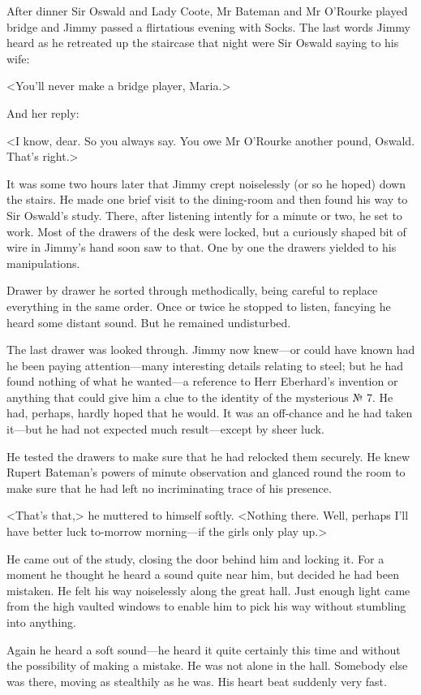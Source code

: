 After dinner Sir Oswald and Lady Coote, Mr Bateman and Mr O'Rourke played bridge and Jimmy passed a flirtatious evening with Socks. The last words Jimmy heard as he retreated up the staircase that night were Sir Oswald saying to his wife:

<You'll never make a bridge player, Maria.>

And her reply:

<I know, dear. So you always say. You owe Mr O'Rourke another pound, Oswald. That's right.>

It was some two hours later that Jimmy crept noiselessly (or so he hoped) down the stairs. He made one brief visit to the dining-room and then found his way to Sir Oswald's study. There, after listening intently for a minute or two, he set to work. Most of the drawers of the desk were locked, but a curiously shaped bit of wire in Jimmy's hand soon saw to that. One by one the drawers yielded to his manipulations.

Drawer by drawer he sorted through methodically, being careful to replace everything in the same order. Once or twice he stopped to listen, fancying he heard some distant sound. But he remained undisturbed.

The last drawer was looked through. Jimmy now knew—or could have known had he been paying attention—many interesting details relating to steel; but he had found nothing of what he wanted—a reference to Herr Eberhard's invention or anything that could give him a clue to the identity of the mysterious № 7. He had, perhaps, hardly hoped that he would. It was an off-chance and he had taken it—but he had not expected much result—except by sheer luck.

He tested the drawers to make sure that he had relocked them securely. He knew Rupert Bateman's powers of minute observation and glanced round the room to make sure that he had left no incriminating trace of his presence.

<That's that,> he muttered to himself softly. <Nothing there. Well, perhaps I'll have better luck to-morrow morning—if the girls only play up.>

He came out of the study, closing the door behind him and locking it. For a moment he thought he heard a sound quite near him, but decided he had been mistaken. He felt his way noiselessly along the great hall. Just enough light came from the high vaulted windows to enable him to pick his way without stumbling into anything.

Again he heard a soft sound—he heard it quite certainly this time and without the possibility of making a mistake. He was not alone in the hall. Somebody else was there, moving as stealthily as he was. His heart beat suddenly very fast.

